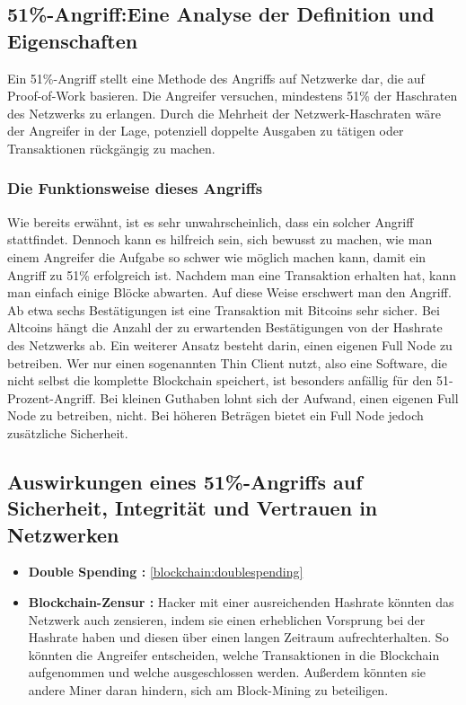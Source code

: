 \subsection{51\%-Angriff:Eine Analyse der Definition und Eigenschaften}
Ein 51\%-Angriff stellt eine Methode des Angriffs auf Netzwerke dar, die auf Proof-of-Work basieren. Die Angreifer versuchen, mindestens 51\% der Haschraten des Netzwerks zu erlangen. Durch die Mehrheit der Netzwerk-Haschraten wäre der Angreifer in der Lage, potenziell doppelte Ausgaben zu tätigen oder Transaktionen rückgängig zu machen. \cite{51attack}
\subsubsection{Die Funktionsweise dieses Angriffs}
Wie bereits erwähnt, ist es sehr unwahrscheinlich, dass ein solcher Angriff stattfindet. Dennoch kann es hilfreich sein, sich bewusst zu machen, wie man einem Angreifer die Aufgabe so schwer wie möglich machen kann, damit ein Angriff zu 51\% erfolgreich ist.
Nachdem man eine Transaktion erhalten hat, kann man einfach einige Blöcke abwarten. Auf diese Weise erschwert man den Angriff. Ab etwa sechs Bestätigungen ist eine Transaktion mit Bitcoins sehr sicher. Bei Altcoins hängt die Anzahl der zu erwartenden Bestätigungen von der Hashrate des Netzwerks ab.
Ein weiterer Ansatz besteht darin, einen eigenen Full Node zu betreiben. Wer nur einen sogenannten Thin Client nutzt, also eine Software, die nicht selbst die komplette Blockchain speichert, ist besonders anfällig für den 51-Prozent-Angriff. Bei kleinen Guthaben lohnt sich der Aufwand, einen eigenen Full Node zu betreiben, nicht. Bei höheren Beträgen bietet ein Full Node jedoch zusätzliche Sicherheit.


\subsection{Auswirkungen eines 51\%-Angriffs auf Sicherheit, Integrität und Vertrauen in Netzwerken}
\begin{itemize}
	\item \textbf{Double Spending : } \cref{blockchain:doublespending}
	\item \textbf{Blockchain-Zensur : } Hacker mit einer ausreichenden Hashrate könnten das Netzwerk auch zensieren, indem sie einen erheblichen Vorsprung bei der Hashrate haben und diesen über einen langen Zeitraum aufrechterhalten. So könnten die Angreifer entscheiden, welche Transaktionen in die Blockchain aufgenommen und welche ausgeschlossen werden. Außerdem könnten sie andere Miner daran hindern, sich am Block-Mining zu beteiligen.
\end{itemize}

